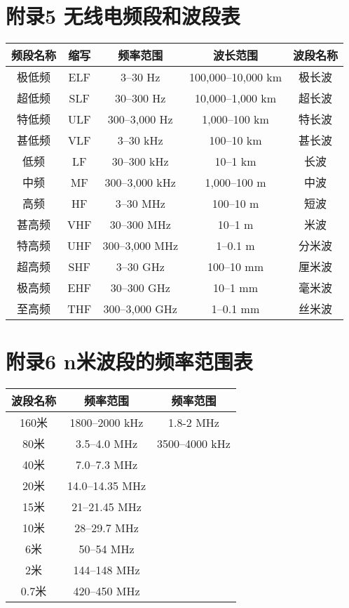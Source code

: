 \newpage

\section{附录5 无线电频段和波段表}

\begin{tabular}{|c|c|c|c|c|}
	\hline
	\textbf{频段名称} & \textbf{缩写} & \textbf{频率范围} & \textbf{波长范围} & \textbf{波段名称} \\
	\hline
	极低频 & ELF & 3–30 Hz & 100,000–10,000 km & 极长波 \\
	\hline
	超低频 & SLF & 30–300 Hz & 10,000–1,000 km & 超长波 \\
	\hline
	特低频 & ULF & 300–3,000 Hz & 1,000–100 km & 特长波 \\
	\hline
	甚低频 & VLF & 3–30 kHz & 100–10 km & 甚长波 \\
	\hline
	低频 & LF & 30–300 kHz & 10–1 km & 长波 \\
	\hline
	中频 & MF & 300–3,000 kHz & 1,000–100 m & 中波 \\
	\hline
	高频 & HF & 3–30 MHz & 100–10 m & 短波 \\
	\hline
	甚高频 & VHF & 30–300 MHz & 10–1 m & 米波 \\
	\hline
	特高频 & UHF & 300–3,000 MHz & 1–0.1 m & 分米波 \\
	\hline
	超高频 & SHF & 3–30 GHz & 100–10 mm & 厘米波 \\
	\hline
	极高频 & EHF & 30–300 GHz & 10–1 mm & 毫米波 \\
	\hline
	至高频 & THF & 300–3,000 GHz & 1–0.1 mm & 丝米波 \\
	\hline
\end{tabular}

\newpage






\section{附录6 n米波段的频率范围表}


\begin{tabular}{|c|c|c|}
	\hline
	\textbf{波段名称} & \textbf{频率范围} & \textbf{频率范围} \\
	\hline
	160米 & 1800–2000 kHz & 1.8-2 MHz \\
	\hline
	80米 & 3.5–4.0 MHz & 3500–4000 kHz \\
	\hline
	40米 & 7.0–7.3 MHz &  \\
	\hline
	20米 & 14.0–14.35 MHz & \\
	\hline
	15米 & 21–21.45 MHz & \\
	\hline
	10米 & 28–29.7 MHz & \\
	\hline
	6米 & 50–54 MHz & \\
	\hline
	2米 & 144–148 MHz & \\
	\hline
	0.7米 & 420–450 MHz & \\
	\hline
\end{tabular}

